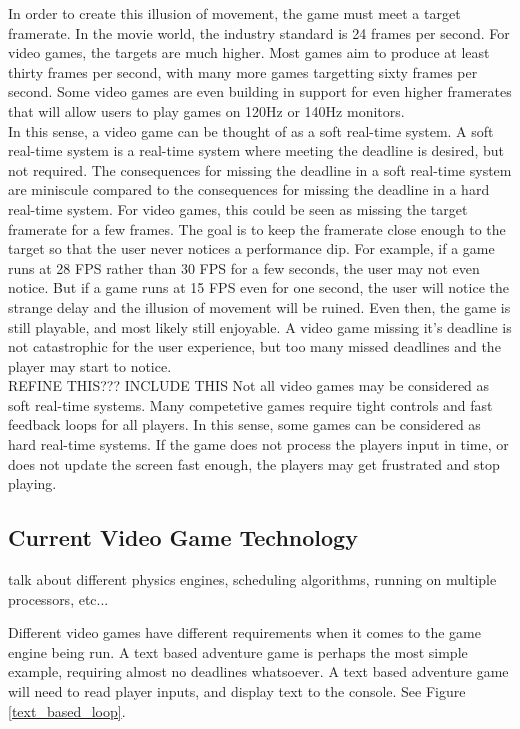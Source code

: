 \documentclass[a4paper, 12pt]{article}
\begin{document}
        In order to create this illusion of movement, the game must meet a target framerate. In the movie world, the industry standard is 24 frames per second. For video games, the targets are much higher. Most games aim to produce at least thirty frames per second, with many more games targetting sixty frames per second. Some video games are even building in support for even higher framerates that will allow users to play games on 120Hz or 140Hz monitors. \\

        In this sense, a video game can be thought of as a soft real-time system. A soft real-time system is a real-time system where meeting the deadline is desired, but not required. The consequences for missing the deadline in a soft real-time system are miniscule compared to the consequences for missing the deadline in a hard real-time system. For video games, this could be seen as missing the target framerate for a few frames. The goal is to keep the framerate close enough to the target so that the user never notices a performance dip. For example, if a game runs at 28 FPS rather than 30 FPS for a few seconds, the user may not even notice. But if a game runs at 15 FPS even for one second, the user will notice the strange delay and the illusion of movement will be ruined. Even then, the game is still playable, and most likely still enjoyable. A video game missing it's deadline is not catastrophic for the user experience, but too many missed deadlines and the player may start to notice. \\

        REFINE THIS??? INCLUDE THIS
        Not all video games may be considered as soft real-time systems. Many competetive games require tight controls and fast feedback loops for all players. In this sense, some games can be considered as hard real-time systems. If the game does not process the players input in time, or does not update the screen fast enough, the players may get frustrated and stop playing.

    \subsection{Current Video Game Technology}
        talk about different physics engines, scheduling algorithms, running on multiple processors, etc...

        Different video games have different requirements when it comes to the game engine being run. A text based adventure game is perhaps the most simple example, requiring almost no deadlines whatsoever. A text based adventure game will need to read player inputs, and display text to the console. See Figure \ref{text_based_loop}.
        \\
\end{document}
